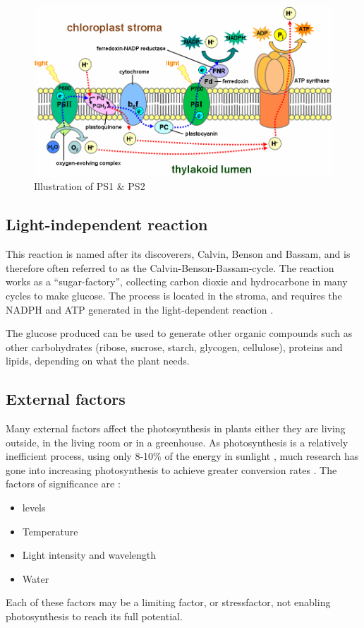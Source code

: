 \begin{figure}
\centering
\includegraphics[width=\textwidth]{img/photosynthesis/ps2_ps1.png}
\caption{Illustration of PS1 \& PS2 \citep{wiki:photosystem}}
\label{fig:photosystem}
\end{figure}

\subsection{Light-independent reaction}
This reaction is named after its discoverers, Calvin, Benson and Bassam, and is therefore often referred to as the Calvin-Benson-Bassam-cycle. The reaction works as a “sugar-factory”, collecting carbon dioxie and hydrocarbone in many cycles to make glucose. The process is located in the stroma, and requires the NADPH and ATP generated in the light-dependent reaction \citep{bi2}. 

The glucose produced can be used to generate other organic compounds such as other carbohydrates (ribose, sucrose, starch, glycogen, cellulose), proteins and lipids, depending on what the plant needs.

\subsection{External factors}
Many external factors affect the photosynthesis in plants either they are living outside, in the living room or in a greenhouse. As photosynthesis is a relatively inefficient process, using only 8-10\% of the energy in sunlight \citetext{Long et. al, 2006; Zhu et. al, 2010, referenced in \citealp{kirschbaum2011does}}, much research has gone into increasing photosynthesis to achieve greater conversion rates \citetext{Reynolds et al., 2000; Sinclair et al., 2004; Long et al., 2006; Zhu et al., 2010, referenced in \citealp{kirschbaum2011does}}. The factors of significance are \citep{bios}:
\begin{itemize}
\item {} levels
\item Temperature
\item Light intensity and wavelength
\item Water
\end{itemize}
Each of these factors may be a limiting factor, or stressfactor, not enabling photosynthesis to reach its full potential. 

